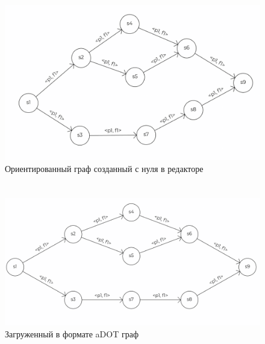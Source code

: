 \chapter{}\label{apx_a4}
\begin{figure}[!h]
\centerline{\includegraphics[scale=0.5]{images/1.png}}
\caption{Ориентированный граф созданный с нуля в редакторе}
\label{g1}
\end{figure}

\chapter{}\label{apx_a5}
\begin{figure}[!h]
\centerline{\includegraphics[scale=0.5]{images/2.png}}
\caption{Загруженный в формате aDOT граф}
\label{g2}
\end{figure}

